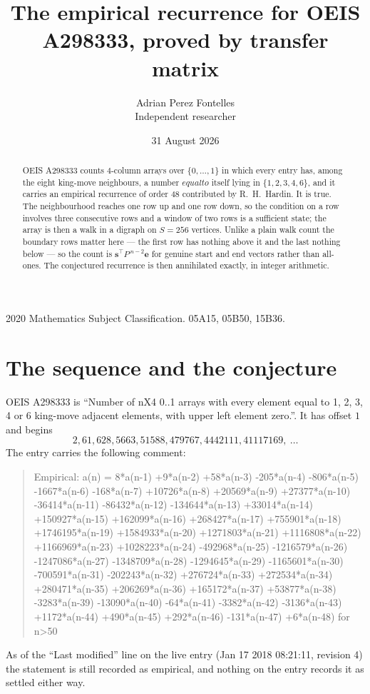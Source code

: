 \documentclass[11pt,a4paper]{article}
\title{The empirical recurrence for OEIS A298333, proved by transfer matrix}
\author{Adrian Perez Fontelles\\ \small Independent researcher}
\date{31 August 2026}
\theoremstyle{plain}
\theoremstyle{definition}
\begin{document}
\maketitle

\begin{abstract}
OEIS A298333 counts $4$-column arrays over $\{0,\dots,1\}$ in which every entry has,
among the eight king-move neighbours, a number $equal to$ itself lying in $\{1,2,3,4,6\}$, and it carries an empirical
recurrence of order $48$ contributed by R.~H.~Hardin. It is true. The neighbourhood
reaches one row up and one row down, so the condition on a row involves three consecutive
rows and a window of two rows is a sufficient state; the array is then a walk in a digraph
on $S=256$ vertices. Unlike a plain walk count the boundary rows matter here --- the first
row has nothing above it and the last nothing below --- so the count is
$\mathbf{s}^{\!\top}P^{\,n-2}\mathbf{e}$ for genuine start and end vectors rather than
all-ones. The conjectured recurrence is then annihilated exactly, in integer arithmetic.
\end{abstract}

\noindent\small 2020 Mathematics Subject Classification. 05A15, 05B50, 15B36.\normalsize

\section{The sequence and the conjecture}

OEIS A298333 is ``Number of nX4 0..1 arrays with every element equal to 1, 2, 3, 4 or 6 king-move adjacent elements, with upper left element zero.''. It has offset
$1$ and begins
\[
2, 61, 628, 5663, 51588, 479767, 4442111, 41117169,\ \dots
\]
The entry carries the following comment:
\begin{quote}\small
Empirical: a(n) = 8*a(n-1) +9*a(n-2) +58*a(n-3) -205*a(n-4) -806*a(n-5) -1667*a(n-6) -168*a(n-7) +10726*a(n-8) +20569*a(n-9) +27377*a(n-10) -36414*a(n-11) -86432*a(n-12) -134644*a(n-13) +33014*a(n-14) +150927*a(n-15) +162099*a(n-16) +268427*a(n-17) +755901*a(n-18) +1746195*a(n-19) +1584933*a(n-20) +1271803*a(n-21) +1116808*a(n-22) +1166969*a(n-23) +1028223*a(n-24) -492968*a(n-25) -1216579*a(n-26) -1247086*a(n-27) -1348709*a(n-28) -1294645*a(n-29) -1165601*a(n-30) -700591*a(n-31) -202243*a(n-32) +276724*a(n-33) +272534*a(n-34) +280471*a(n-35) +206269*a(n-36) +165172*a(n-37) +53877*a(n-38) -3283*a(n-39) -13090*a(n-40) -64*a(n-41) -3382*a(n-42) -3136*a(n-43) +1172*a(n-44) +490*a(n-45) +292*a(n-46) -131*a(n-47) +6*a(n-48) for n>50
\end{quote}
As of the ``Last modified'' line on the live entry (Jan 17 2018 08:21:11, revision
4) the statement is still recorded as empirical, and nothing on the entry
records it as settled either way.
\end{document}
